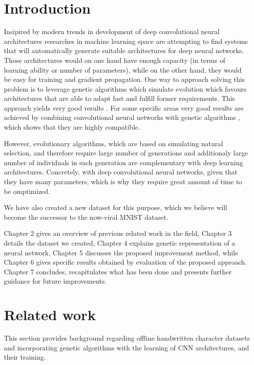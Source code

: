 \documentclass[eng]{simposium}
\begin{document}
\section{Introduction}

Insipired by modern trends in development of deep convolutional neural architectures \cite{28}\cite{29} researches in machine 
learning space are attempting to find systems that will automatically generate suitable architectures for deep neural networks.
Those architectures would on one hand have enough capacity (in terms of learning ability or number of parameters), while on 
the other hand, they would be easy for training and gradient propagation.
One way to approach solving this problem is to leverage genetic algorithms which simulate evolution which favours architectures 
that are able to adapt fast and fulfill former requirements.
This approach yields very good results \cite{5}\cite{30}\cite{31}. 
For some specific areas very good results are achieved by combining convolutional neural networks with genetic algorithms \cite{32}\cite{33},
which shows that they are highly compatible. 

However, evolutionary algorithms, which are based on simulating natural selection, and therefore require large number 
of generations and additionaly large number of individuals in each generation are complementary with deep learning architectures.
Concretely, with deep convolutional neural networks, given that they have many parameters, which is why they require great 
amount of time to be omptimized.   

We have also created a new dataset for this purpose, which we believe will become the successor to the now-viral MNIST dataset.

Chapter 2 gives an overview of previous related work in the field, Chapter 3 details the dataset we created,
Chapter 4 explains genetic representation of a neural network,
Chapter 5 discusses the proposed improvement method, while Chapter 6 gives specific results obtained by evaluation of the proposed approach.
Chapter 7 concludes, recapitulates what has been done and presents further guidance for future improvements.

\section{Related work}

This section provides background regarding offline handwritten character datasets and incorporating genetic algorithms 
with the learning of CNN architectures, and their training. 
\end{document}
